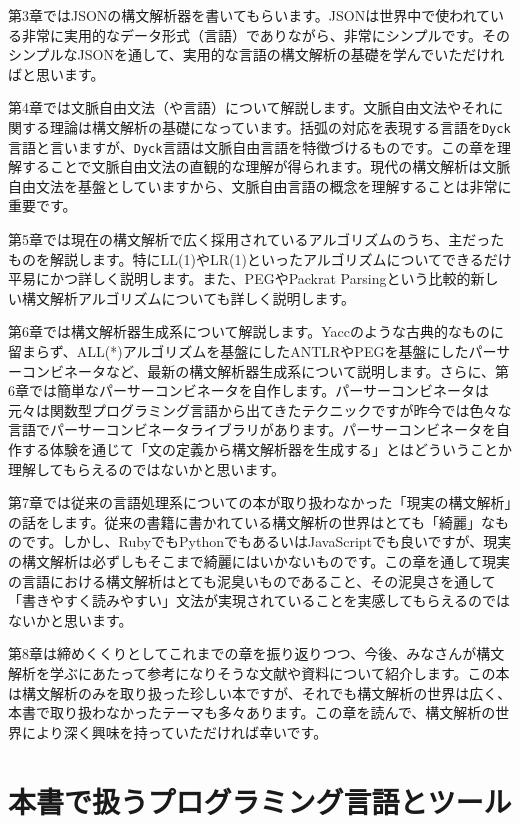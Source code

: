 第3章ではJSONの構文解析器を書いてもらいます。JSONは世界中で使われている非常に実用的なデータ形式（言語）でありながら、非常にシンプルです。そのシンプルなJSONを通して、実用的な言語の構文解析の基礎を学んでいただければと思います。

第4章では文脈自由文法（や言語）について解説します。文脈自由文法やそれに関する理論は構文解析の基礎になっています。括弧の対応を表現する言語を\texttt{Dyck}言語と言いますが、\texttt{Dyck}言語は文脈自由言語を特徴づけるものです。この章を理解することで文脈自由文法の直観的な理解が得られます。現代の構文解析は文脈自由文法を基盤としていますから、文脈自由言語の概念を理解することは非常に重要です。

第5章では現在の構文解析で広く採用されているアルゴリズムのうち、主だったものを解説します。特にLL(1)やLR(1)といったアルゴリズムについてできるだけ平易にかつ詳しく説明します。また、PEGやPackrat
Parsingという比較的新しい構文解析アルゴリズムについても詳しく説明します。

第6章では構文解析器生成系について解説します。Yaccのような古典的なものに留まらず、ALL(*)アルゴリズムを基盤にしたANTLRやPEGを基盤にしたパーサーコンビネータなど、最新の構文解析器生成系について説明します。さらに、第6章では簡単なパーサーコンビネータを自作します。パーサーコンビネータは元々は関数型プログラミング言語から出てきたテクニックですが昨今では色々な言語でパーサーコンビネータライブラリがあります。パーサーコンビネータを自作する体験を通じて「文の定義から構文解析器を生成する」とはどういうことか理解してもらえるのではないかと思います。

第7章では従来の言語処理系についての本が取り扱わなかった「現実の構文解析」の話をします。従来の書籍に書かれている構文解析の世界はとても「綺麗」なものです。しかし、RubyでもPythonでもあるいはJavaScriptでも良いですが、現実の構文解析は必ずしもそこまで綺麗にはいかないものです。この章を通して現実の言語における構文解析はとても泥臭いものであること、その泥臭さを通して「書きやすく読みやすい」文法が実現されていることを実感してもらえるのではないかと思います。

第8章は締めくくりとしてこれまでの章を振り返りつつ、今後、みなさんが構文解析を学ぶにあたって参考になりそうな文献や資料について紹介します。この本は構文解析のみを取り扱った珍しい本ですが、それでも構文解析の世界は広く、本書で取り扱わなかったテーマも多々あります。この章を読んで、構文解析の世界により深く興味を持っていただければ幸いです。

\hypertarget{chapter1-ux672cux66f8ux3067ux6271ux3046ux30d7ux30edux30b0ux30e9ux30dfux30f3ux30b0ux8a00ux8a9eux3068ux30c4ux30fcux30eb}{%
\section{本書で扱うプログラミング言語とツール}\label{chapter1-ux672cux66f8ux3067ux6271ux3046ux30d7ux30edux30b0ux30e9ux30dfux30f3ux30b0ux8a00ux8a9eux3068ux30c4ux30fcux30eb}}

